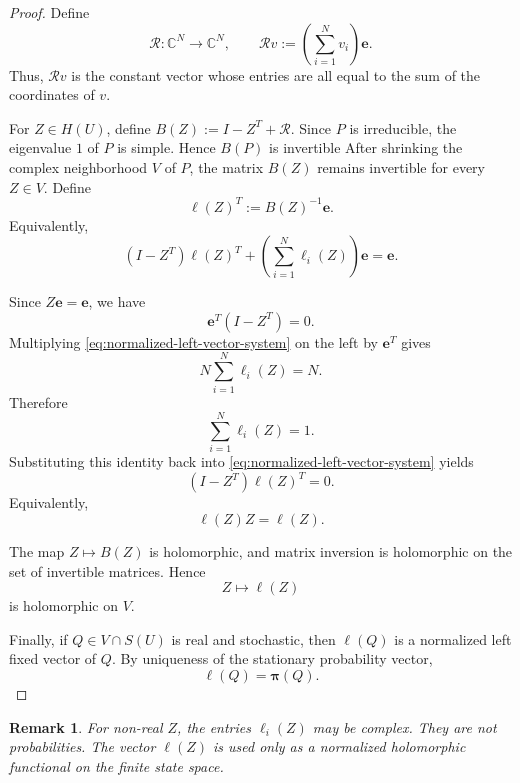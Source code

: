 \documentclass[11pt,a4paper]{amsart}
\newtheorem{remark}[theorem]{Remark}
\newcommand{\C}{\mathbb C}
\begin{document}
\begin{proof}
Define
$$
 \mathcal R:\C^N\longrightarrow\C^N,
 \qquad
 \mathcal Rv
 :=
 \left(\sum_{i=1}^N v_i\right)\mathbf e.
$$
Thus, \(\mathcal Rv\) is the constant vector whose entries are all
equal to the sum of the coordinates of \(v\).

For \(Z\in H(U)\), define $B(Z):=I-Z^T+\mathcal R$.
Since \(P\) is irreducible, the eigenvalue \(1\) of \(P\) is simple. Hence $B(P)$ is invertible
%
After shrinking the complex neighborhood \(V\) of \(P\), the matrix
\(B(Z)\) remains invertible for every \(Z\in V\).  Define
\[
 \boldsymbol\ell(Z)^T:=B(Z)^{-1}\mathbf e.
\]
Equivalently,
\begin{equation}\label{eq:normalized-left-vector-system}
 (I-Z^T)\boldsymbol\ell(Z)^T
 +
 \left(\sum_{i=1}^N\ell_i(Z)\right)\mathbf e
 =
 \mathbf e.
\end{equation}

Since \(Z\mathbf e=\mathbf e\), we have
\[
 \mathbf e^T(I-Z^T)=0.
\]
Multiplying \eqref{eq:normalized-left-vector-system} on the left by
\(\mathbf e^T\) gives
\[
 N\sum_{i=1}^N\ell_i(Z)=N.
\]
Therefore
\[
 \sum_{i=1}^N\ell_i(Z)=1.
\]
Substituting this identity back into
\eqref{eq:normalized-left-vector-system} yields
\[
 (I-Z^T)\boldsymbol\ell(Z)^T=0.
\]
Equivalently,
\[
 \boldsymbol\ell(Z)Z=\boldsymbol\ell(Z).
\]

The map \(Z\mapsto B(Z)\) is holomorphic, and matrix inversion is
holomorphic on the set of invertible matrices.  Hence
\[
 Z\longmapsto\boldsymbol\ell(Z)
\]
is holomorphic on \(V\).

Finally, if \(Q\in V\cap S(U)\) is real and stochastic, then
\(\boldsymbol\ell(Q)\) is a normalized left fixed vector of \(Q\).
By uniqueness of the stationary probability vector,
\[
 \boldsymbol\ell(Q)=\boldsymbol\pi(Q).
\]
\end{proof}


\begin{remark}
For non-real \(Z\), the entries \(\ell_i(Z)\) may be complex.
They are not probabilities.  The vector
\(\boldsymbol\ell(Z)\) is used only as a normalized holomorphic
functional on the finite state space.
\end{remark}
\end{document}
